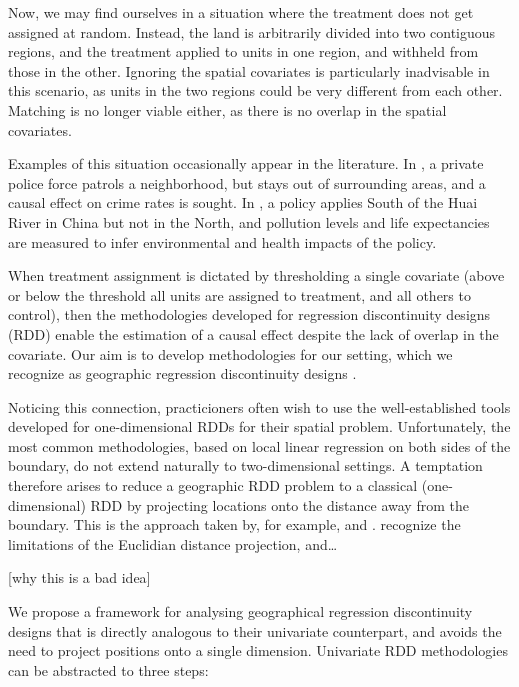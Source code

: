 \documentclass[letter]{article}
\renewcommand{\cite}[1]{\citep{#1}}
\begin{document}
Now, we may find ourselves in a situation where the treatment does not get assigned at random.
Instead, the land is arbitrarily divided into two contiguous regions, and the treatment applied to units in one region, and withheld from those in the other.
Ignoring the spatial covariates is particularly inadvisable in this scenario, as units in the two regions could be very different from each other.
Matching is no longer viable either, as there is no overlap in the spatial covariates.

Examples of this situation occasionally appear in the literature. In \cite{macdonald2015effect}, a private police force patrols a neighborhood, but stays out of surrounding areas, and a causal effect on crime rates is sought. In \cite{chen2013evidence}, a policy applies South of the Huai River in China but not in the North, and pollution levels and life expectancies are measured to infer environmental and health impacts of the policy.

When treatment assignment is dictated by thresholding a single covariate (above or below the threshold all units are assigned to treatment, and all others to control), then the methodologies developed for regression discontinuity designs (RDD) enable the estimation of a causal effect despite the lack of overlap in the covariate. Our aim is to develop methodologies for our setting, which we recognize as geographic regression discontinuity designs \cite{keele_titiunik_2015}.

Noticing this connection, practicioners often wish to use the well-established tools developed for one-dimensional RDDs for their spatial problem.
Unfortunately, the most common methodologies, based on local linear regression on both sides of the boundary, do not extend naturally to two-dimensional settings.
A temptation therefore arises to reduce a geographic RDD problem to a classical (one-dimensional) RDD by projecting locations onto the distance away from the boundary.
This is the approach taken by, for example, \cite{macdonald2015effect} and \cite{chen2013evidence}. \cite{keele_titiunik_2015} recognize the limitations of the Euclidian distance projection, and\ldots{}

{[}why this is a bad idea{]}
    


    	We propose a framework for analysing geographical regression discontinuity designs that is directly analogous to their univariate counterpart, and avoids the need to project positions onto a single dimension.
Univariate RDD methodologies can be abstracted to three steps:
\end{document}
